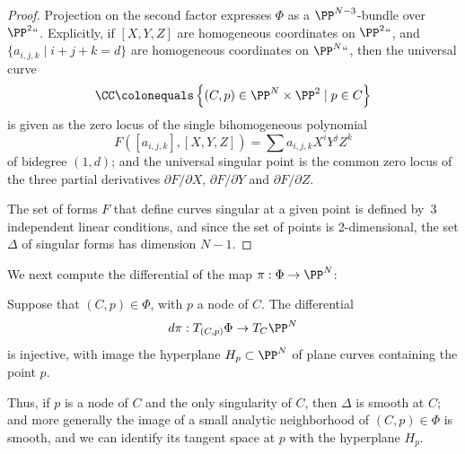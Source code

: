 \begin{proof}
Projection on the second factor expresses $\Phi$ as a $\PP^{N-3}$-bundle over $\PP^2` `$. Explicitly, if $[X,Y,Z]$ are homogeneous coordinates on $\PP^2` `$, and $\{a_{i,j,k} \mid i+j+k = d \}$ are homogeneous coordinates on $\PP^N` `$, then the universal curve
$$
\CC \colonequals  \left\{ (C, p) \in \PP^N \times \PP^2 \mid p \in C \right\}
$$
is given as the zero locus of the single bihomogeneous polynomial
$$
F([a_{i,j,k}], [X,Y,Z] ) = \sum a_{i,j,k} X^iY^jZ^k
$$ 
of bidegree $(1, d)$;
and the universal singular point is the common zero locus of the three partial derivatives $\partial F/\partial X$, $\partial F/\partial Y$ and  $\partial F/\partial Z$.

The set of forms $F$ that define curves singular at a given point is
defined by~3 independent linear conditions, and since the set of
points is 2-dimensional, 
the set $\Delta$ of singular forms has dimension $N-1$.
\end{proof}

We next compute the differential of the map $\pi : \Phi \to \PP^N$:

\begin{lemma}\label{tangent space to discriminant}
Suppose that $(C,p)\in \Phi$, with $p$ a node of $C$.  The differential
$$
d\pi : T_{(C,p)}\Phi \to T_C \PP^N
$$
is injective, with image the hyperplane $H_p \subset \PP^N$ of plane curves containing the point $p$.
\end{lemma}

Thus, if $p$ is a node of $C$ and the only singularity of $C$, then $\Delta$ is smooth at $C$; and more generally the image of a small analytic neighborhood of $(C,p) \in \Phi$ is smooth, and we can identify its tangent space at $p$ with the hyperplane $H_p$.

